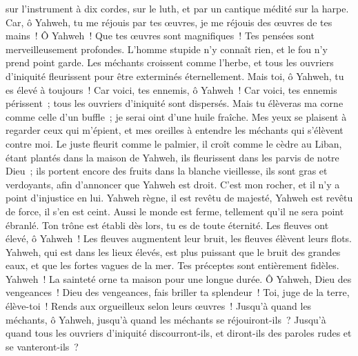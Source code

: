 \begin{multicols}{2}
sur l'instrument à dix cordes, sur le luth, et par un cantique médité sur la harpe.
Car, ô Yahweh, tu me réjouis par tes œuvres, je me réjouis des œuvres de tes mains~!
Ô Yahweh~! Que tes œuvres sont magnifiques~! Tes pensées sont merveilleusement profondes.
L'homme stupide n'y connaît rien, et le fou n'y prend point garde.
Les méchants croissent comme l'herbe, et tous les ouvriers d'iniquité fleurissent pour être exterminés éternellement.
Mais toi, ô Yahweh, tu es élevé à toujours~!
Car voici, tes ennemis, ô Yahweh~! Car voici, tes ennemis périssent~; tous les ouvriers d'iniquité sont dispersés.
Mais tu élèveras ma corne comme celle d'un buffle~; je serai oint d'une huile fraîche.
Mes yeux se plaisent à regarder ceux qui m'épient, et mes oreilles à entendre les méchants qui s'élèvent contre moi.
Le juste fleurit comme le palmier, il croît comme le cèdre au Liban,
étant plantés dans la maison de Yahweh, ils fleurissent dans les parvis de notre Dieu~;
ils portent encore des fruits dans la blanche vieillesse, ils sont gras et verdoyants,
afin d'annoncer que Yahweh est droit. C'est mon rocher, et il n'y a point d'injustice en lui.
\VerseOne{}Yahweh règne, il est revêtu de majesté, Yahweh est revêtu de force, il s'en est ceint. Aussi le monde est ferme, tellement qu'il ne sera point ébranlé.
Ton trône est établi dès lors, tu es de toute éternité.
Les fleuves ont élevé, ô Yahweh~! Les fleuves augmentent leur bruit, les fleuves élèvent leurs flots.
Yahweh, qui est dans les lieux élevés, est plus puissant que le bruit des grandes eaux, et que les fortes vagues de la mer.
Tes préceptes sont entièrement fidèles. Yahweh~! La sainteté orne ta maison pour une longue durée.
\VerseOne{}Ô Yahweh, Dieu des vengeances~! Dieu des vengeances, fais briller ta splendeur~!
Toi, juge de la terre, élève-toi~! Rends aux orgueilleux selon leurs œuvres~!
Jusqu'à quand les méchants, ô Yahweh, jusqu'à quand les méchants se réjouiront-ils~?
Jusqu'à quand tous les ouvriers d'iniquité discourront-ils, et diront-ils des paroles rudes et se vanteront-ils~?

\end{multicols}
